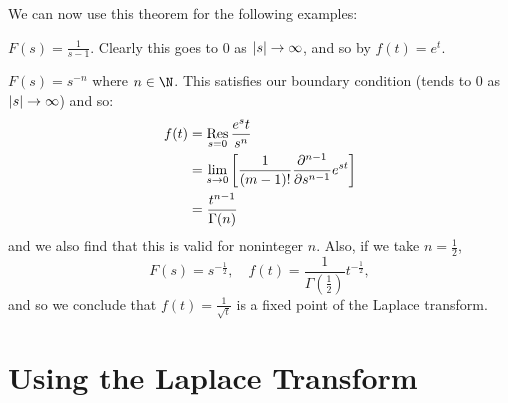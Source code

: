 \documentclass[../Main.tex]{subfiles}
\begin{document}
\begin{examples}{
        We can now use this theorem for the following examples:
    }
    \item $F(s) = \frac1{s-1}$. Clearly this goes to $0$ as $\left|s\right| \to \infty$, and so by  $f(t) = e^t$.
    \item $F(s) = s^{-n}$ where $n \in \N$. This satisfies our boundary condition (tends to $0$ as $\left|s\right| \to \infty$) and so:
        \begin{align*}
            f(t) &= \operatorname*{Res}_{s = 0} \frac{e^st}{s^n} \\
            &= \lim_{s \to 0} \left[\frac{1}{(m-1)!} \frac{\partial^{n-1}}{\partial s^{n-1}} e^{st}\right] \\
            &= \frac{t^{n-1}}{\Gamma(n)}
        \end{align*}
        and we also find that this is valid for noninteger $n$. Also, if we take $n = \frac12$,
        \begin{equation*}
            F(s) = s^{-\frac12},\quad f(t) = \frac{1}{\Gamma\left(\frac12\right)} t^{-\frac12},
        \end{equation*}
        and so we conclude that $f(t) = \frac1{\sqrt{t}}$ is a fixed point of the Laplace transform.
\end{examples}
\section{Using the Laplace Transform}
\end{document}
